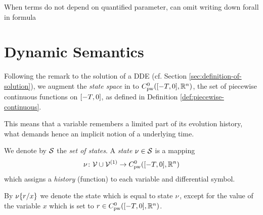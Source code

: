     When terms do not depend on quantified parameter, can omit writing down forall in formula

\section{Dynamic Semantics}
    \label{sec:dynamic-semantics}

    Following the remark to the solution of a DDE (cf. Section \ref{sec:definition-of-solution}), we augment the \emph{state space} in \dL to $\statespace$, the set of piecewise continuous functions on $\delayinterval$, as defined in Definition \ref{def:piecewise-continuous}.

    This means that a variable remembers a limited part of its evolution history, what demands hence an implicit notion of a underlying time.

    We denote by $\states$ the \emph{set of states}. A \emph{state} $\asstate\in\states$ is a mapping
    \begin{equation}
        \asstate \from \allvars\cup\diffvars \to \statespace
    \end{equation}
    which assigns a \emph{history} (function) to each variable and differential symbol.

    By $\modif{\asstate}{x}{r}$ we denote the state which is equal to state $\asstate$, except for the value of the variable $x$ which is set to $r\in\statespace$.



